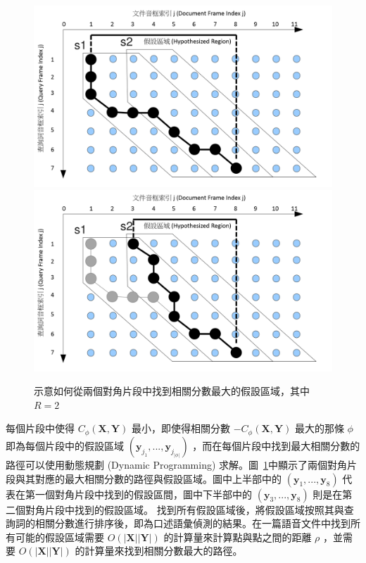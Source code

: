 \begin{figure}[h]
\centering
\includegraphics[scale=0.4]{images/chap2_segdtw_exp1.png}
\includegraphics[scale=0.4]{images/chap2_segdtw_exp2.png}
\caption{示意如何從兩個對角片段中找到相關分數最大的假設區域，其中  $ R=2 $ }
\label{fig:chap2_sdtw_exp}
\end{figure}




每個片段中使得  $ C_{\phi}(\mathbf{X}, \mathbf{Y}) $  最小，即使得相關分數  $ -C_{\phi}(\mathbf{X}, \mathbf{Y}) $  最大的那條  $ \phi $  即為每個片段中的假設區域  $ (\mathbf{y}_{j_1},...,\mathbf{y}_{j_{|\phi|}}) $  ，而在每個片段中找到最大相關分數的路徑可以使用動態規劃 (Dynamic Programming) 求解。圖~\ref{fig:chap2_sdtw_exp}中顯示了兩個對角片段與其對應的最大相關分數的路徑與假設區域。圖中上半部中的  $ (\mathbf{y}_1, ..., \mathbf{y}_8) $  代表在第一個對角片段中找到的假設區間，圖中下半部中的  $ (\mathbf{y}_3, ..., \mathbf{y}_8) $  則是在第二個對角片段中找到的假設區域。 找到所有假設區域後，將假設區域按照其與查詢詞的相關分數進行排序後，即為口述語彙偵測的結果。在一篇語音文件中找到所有可能的假設區域需要  $ O(|\mathbf{X}||\mathbf{Y}|) $  的計算量來計算點與點之間的距離  $ \rho $ ，並需要 $ O(|\mathbf{X}||\mathbf{Y}|) $ 的計算量來找到相關分數最大的路徑。

